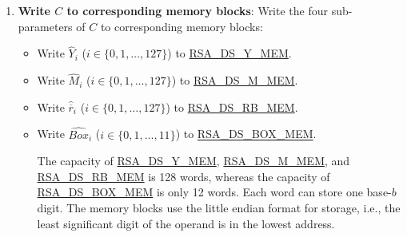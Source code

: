 \documentclass[main\_\_EN.tex]{subfiles}
\begin{document}
\begin{enumerate}
    \item {\bfseries Write \begin{math}C\end{math} to corresponding memory blocks}: Write the four sub-parameters of \begin{math}C\end{math} to corresponding memory blocks:
    \begin{itemize}
        \item Write \begin{math}\widehat{Y}_{i}\end{math}
        (\begin{math}i \in \{ 0, 1, \dots, 127 \} \end{math})
        to \hyperref[RSADSYMEM]{RSA\_DS\_Y\_MEM}.

        \item Write \begin{math}\widehat{M}_{i}\end{math}
        (\begin{math}i \in \{ 0, 1, \dots, 127 \} \end{math})
        to \hyperref[RSADSMMEM]{RSA\_DS\_M\_MEM}.

        \item Write \begin{math}\widehat{\overline{r}}_{i}\end{math}
        (\begin{math}i \in \{ 0, 1, \dots, 127 \} \end{math})
        to \hyperref[RSADSRBMEM]{RSA\_DS\_RB\_MEM}.

        \item Write \begin{math}\widehat{Box}_{i}\end{math}
        (\begin{math}i \in \{ 0, 1, \dots, 11 \} \end{math})
        to \hyperref[RSADSBOXMEM]{RSA\_DS\_BOX\_MEM}.

        The capacity of
        \hyperref[RSADSYMEM]{RSA\_DS\_Y\_MEM},
        \hyperref[RSADSMMEM]{RSA\_DS\_M\_MEM}, and
        \hyperref[RSADSRBMEM]{RSA\_DS\_RB\_MEM} is 128 words, whereas the capacity of
        \hyperref[RSADSBOXMEM]{RSA\_DS\_BOX\_MEM} is only 12 words.
        Each word can store one base-\begin{math}b\end{math} digit. The memory blocks use the little endian format for storage, i.e., the least significant digit of the operand is in the lowest address.


\end{itemize}
\end{enumerate}
\end{document}

